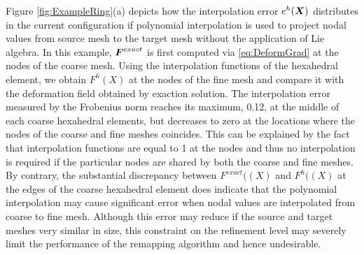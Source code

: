 \documentclass[12pt]{article}
\begin{document}
Figure \ref{fig:ExampleRing}(a) depicts how the interpolation error
$e^{h}({\boldsymbol{X}})$ distributes in the current configuration if polynomial
interpolation is used to project nodal values from source mesh to the
target mesh without the application of Lie algebra.  In this example,
${\boldsymbol{F}}^{exact}$ is first computed via \eqref{eq:DeformGrad} at the nodes
of the coarse mesh. Using the interpolation functions of the
hexahedral element, we obtain $F^{h}(X)$ at the nodes of the fine mesh
and compare it with the deformation field obtained by exaction
solution. The interpolation error measured by the Frobenius norm
reaches its maximum, 0.12, at the middle of each coarse hexahedral
elements, but decreases to zero at the locations where the nodes of
the coarse and fine meshes coincides. This can be explained by the
fact that interpolation functions are equal to 1 at the nodes and thus
no interpolation is required if the particular nodes are shared by
both the coarse and fine meshes. By contrary, the substantial
discrepancy between $F^{exact}((X)$ and $F^{h}((X)$ at the edges of
the coarse hexahedral element does indicate that the polynomial
interpolation may cause significant error when nodal values are
interpolated from coarse to fine mesh. Although this error may reduce
if the source and target meshes very similar in size, this constraint
on the refinement level may severely limit the performance of the
remapping algorithm and hence undesirable.
\end{document}
